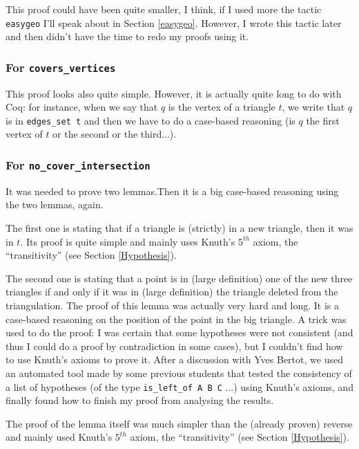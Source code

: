 \documentclass[a4paper,10pt]{article}
\begin{document}
  This proof could have been quite smaller, I think, if I used more the tactic {\tt easygeo} I'll speak about in Section \ref{easygeo}. However, I wrote this tactic later and then didn't have the time to redo my proofs using it.

  \subsubsection{For {\tt covers\_vertices}}
  \label{cvv1}
  
  This proof looks also quite simple. However, it is actually quite long to do with Coq: for instance, when we say that $q$ is the vertex of a triangle $t$, we write that $q$ is in {\tt edges\_set t} and then we have to do a case-based reasoning (is $q$ the first vertex of $t$ or the second or the third...).

  \subsubsection{For {\tt no\_cover\_intersection}}

 It was needed to prove two lemmas.Then it is a big case-based reasoning using the two lemmas, again.

  The first one is stating that if a triangle is (strictly) in a new triangle, then it was in $t$.
  Its proof is quite simple and mainly uses Knuth's $5^{th}$ axiom, the ``transitivity'' (see Section \ref{Hypothesis}).
  
  The second one is stating that a point is in (large definition) one of the new three triangles if and only if it was in (large definition) the triangle deleted from the triangulation. The proof of this lemma was actually very hard and long. It is a case-based reasoning on the position of the point in the big triangle. A trick was used to do the proof: I was certain that some hypotheses were not consistent (and thus I could do a proof by contradiction in some cases), but I couldn't find how to use Knuth's axioms to prove it. After a discussion with Yves Bertot, we used an automated tool made by some previous students that tested the consistency of a list of hypotheses (of the type {\tt is\_left\_of A B C} ...) using Knuth's axioms, and finally found how to finish my proof from analysing the results.

  
  
  The proof of the lemma itself was much simpler than the (already proven) reverse and mainly used Knuth's $5^{th}$ axiom, the ``transitivity'' (see Section \ref{Hypothesis}).
  
\end{document}
